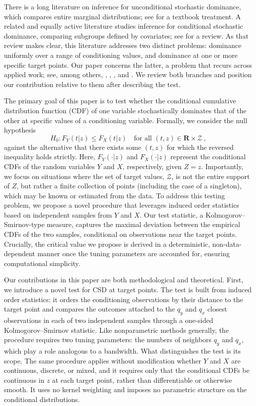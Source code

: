 \documentclass[11pt]{article}
\numberwithin{equation}{section}
\begin{document}
There is a long literature on inference for unconditional stochastic dominance, which compares entire marginal distributions; see \citet{whang:2019} for a textbook treatment. A related and equally active literature studies inference for conditional stochastic dominance, comparing subgroups defined by covariates; see \citet[Chapter 4]{whang:2019} for a review. As that review makes clear, this literature addresses two distinct problems: dominance uniformly over a range of conditioning values, and dominance at one or more specific target points. Our paper concerns the latter, a problem that recurs across applied work; see, among others, \citet{shen:2019}, \citet{qu/yoon:2019}, \citet{barcellos/carvalho/turley:2023}, and \citet{Li/Sunder:2024}. We review both branches and position our contribution relative to them after describing the test.

The primary goal of this paper is to test whether the conditional cumulative distribution function (CDF) of one variable stochastically dominates that of the other at specific values of a conditioning variable. Formally, we consider the null hypothesis  
\[
H_0: F_Y(t | z) \leq F_X(t | z) \quad \text{for all } (t, z) \in \mathbf{R} \times \mathcal{Z}~,
\]
against the alternative that there exists some \((t, z)\) for which the reversed inequality holds strictly. Here, \( F_Y(\cdot | z) \) and \( F_X(\cdot | z) \) represent the conditional CDFs of the random variables \( Y \) and \( X \), respectively, given \( Z = z \). Importantly, we focus on situations where the set of target values,  $\mathcal{Z}$, is not the entire support of $Z$, but rather a finite collection of points (including the case of a singleton), which may be known or estimated from the data. To address this testing problem, we propose a novel procedure that leverages induced order statistics based on independent samples from \( Y \) and \( X \). Our test statistic, a Kolmogorov--Smirnov-type measure, captures the maximal deviation between the empirical CDFs of the two samples, conditional on observations near the target points. Crucially, the critical value we propose is derived in a deterministic, non-data-dependent manner once the tuning parameters are accounted for, ensuring computational simplicity. 

Our contributions in this paper are both methodological and theoretical. First, we introduce a novel test for CSD at target points. The test is built from induced order statistics: it orders the conditioning observations by their distance to the target point and compares the outcomes attached to the $q_y$ and $q_x$ closest observations in each of two independent samples through a one-sided Kolmogorov--Smirnov statistic. Like nonparametric methods generally, the procedure requires two tuning parameters: the numbers of neighbors $q_y$ and $q_x$, which play a role analogous to a bandwidth. What distinguishes the test is its scope. The same procedure applies without modification whether $Y$ and $X$ are continuous, discrete, or mixed, and it requires only that the conditional CDFs be continuous in $z$ at each target point, rather than differentiable or otherwise smooth. It uses no kernel weighting and imposes no parametric structure on the conditional distributions.
\end{document}
